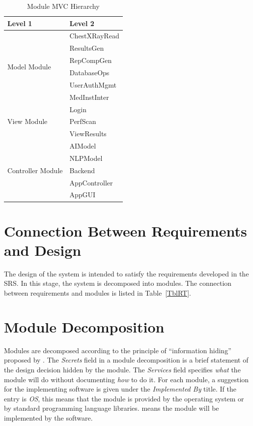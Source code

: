 \documentclass[12pt, titlepage]{article}
\begin{document}
\begin{table}[H]
  \centering
  \begin{tabular}{p{} p{}}
    \toprule
    \textbf{Level 1} & \textbf{Level 2} \\
    \midrule

    \multirow{6}{0.3\textwidth}{Model Module} & ChestXRayRead \\
    & ResultsGen \\
    & RepCompGen \\
    & DatabaseOps \\
    & UserAuthMgmt \\
    & MedInstInter \\
    \midrule

    \multirow{3}{0.3\textwidth}{View Module} & Login \\ 
    & PerfScan \\
    & ViewResults \\
    \midrule

    \multirow{5}{0.3\textwidth}{Controller Module} & AIModel \\
    & NLPModel \\
    & Backend \\
    & AppController \\
    & AppGUI \\
    \bottomrule

  \end{tabular}
  \caption{Module MVC Hierarchy}
  \label{TblMMH}
\end{table}

\section{Connection Between Requirements and Design} \label{SecConnection}

The design of the system is intended to satisfy the requirements developed in
the SRS. In this stage, the system is decomposed into modules. The connection
between requirements and modules is listed in Table~\ref{TblRT}.

\section{Module Decomposition} \label{SecMD}

Modules are decomposed according to the principle of ``information hiding''
proposed by \citet{ParnasEtAl1984}. The \emph{Secrets} field in a module
decomposition is a brief statement of the design decision hidden by the
module. The \emph{Services} field specifies \emph{what} the module will do
without documenting \emph{how} to do it. For each module, a suggestion for the
implementing software is given under the \emph{Implemented By} title. If the
entry is \emph{OS}, this means that the module is provided by the operating
system or by standard programming language libraries.  \emph{\progname{}} means the
module will be implemented by the \progname{} software.
\end{document}

